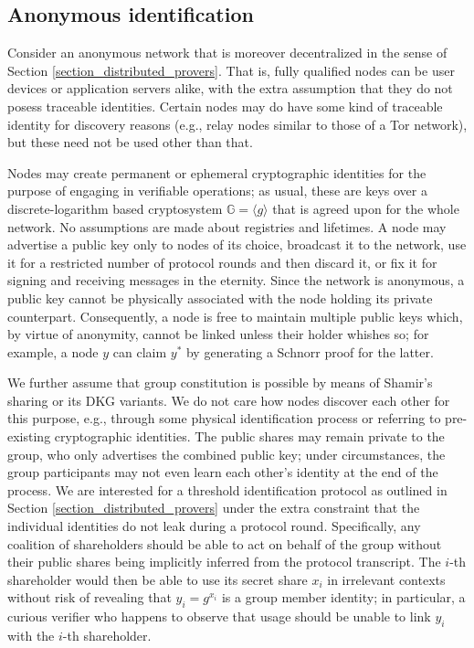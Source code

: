 \documentclass[psamsfonts, reqno]{amsart}
\theoremstyle{definition}
\theoremstyle{remark}
\numberwithin{equation}{section}
\begin{document}
\subsection{Anonymous identification}\label{section_anonymous_identification}

Consider an anonymous network that is moreover
decentralized in the sense of Section
\ref{section_distributed_provers}.
That is, fully qualified nodes
can be user devices or application servers alike,
with the extra assumption that they do not posess traceable identities.
Certain nodes may do have some kind of traceable identity
for discovery reasons
(e.g., relay nodes similar to those of a Tor network),
but these need not be used other than that.

Nodes may create permanent or ephemeral cryptographic identities for
the purpose of engaging in verifiable operations; as usual,
these are keys over a discrete-logarithm based cryptosystem
$\mathbb{G} = \langle g \rangle$ that is
agreed upon for the whole network.
No assumptions are made about registries and lifetimes.
A node may advertise a public key only to nodes of its choice,
broadcast it to the network, use it for a restricted
number of protocol rounds and then discard it,
or fix it for signing and receiving messages in the eternity.
Since the network is anonymous, a public key cannot be
physically associated with the node holding its private counterpart.
Consequently, a node is free to maintain
multiple public keys which,
by virtue of anonymity, cannot be linked
unless their holder whishes so; for example,
a node $y$ can claim $y^*$
by generating a Schnorr proof for the latter.

We further assume that group constitution is possible by means
of Shamir's sharing or its DKG variants.
We do not care how nodes discover each other for this purpose,
e.g., through some physical identification
process or referring to pre-existing cryptographic identities.
The public shares
may remain private to the group,
who only advertises the combined public key;
under circumstances, the group participants
may not even learn each other's identity
at the end of the process.
We are interested for a threshold identification
protocol as outlined in Section \ref{section_distributed_provers}
under the extra constraint that
the individual identities
do not leak during a protocol round.
Specifically, any coalition of shareholders
should be able to act on behalf of the group without
their public shares being implicitly inferred
from the protocol transcript.
The $i$-th shareholder would then be able to use
its secret share $x_i$
in irrelevant contexts without risk of revealing that
$y_i = g ^ {x_i}$ is a group member identity; in particular,
a curious verifier who happens to observe that usage
should be unable to link $y_i$ with the $i$-th shareholder.
\end{document}
